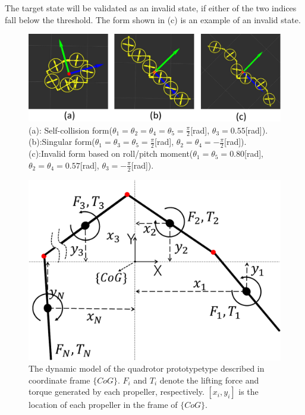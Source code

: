 \par
The target state will be validated as an invalid state, if either of the two indices fall below the threshold. The form shown in (c) is an example of an invalid state.

\begin{figure}[t]
  \begin{center}
    \includegraphics[width=1.0\columnwidth]{figs/invalid_forms.pdf}
  \end{center}
  \caption{(a): Self-collision form($\theta_1=\theta_2=\theta_4=\theta_5=\frac{\pi}{2}$[rad], $\theta_3=0.55$[rad]). (b):Singular form($\theta_1=\theta_3=\theta_5=\frac{\pi}{2}$[rad], $\theta_2=\theta_4=-\frac{\pi}{2}$[rad]). (c):Invalid form based on roll/pitch moment($\theta_1=\theta_5=0.80$[rad], $\theta_2=\theta_4=0.57$[rad], $\theta_3=-\frac{\pi}{2}$[rad]).\label{figure:invalid_forms}}
\end{figure}

\begin{figure}[t]
  \begin{center}
    \includegraphics[width=0.9\columnwidth]{figs/dynamic_model.pdf}
    \caption{The dynamic model of the quadrotor prototypetype described in coordinate frame $\{CoG\}$. $F_i$ and $T_i$ denote the lifting force and torque generated by each propeller, respectively. $[x_i, y_i]$ is the location of each propeller in the frame of $\{CoG\}$.\label{figure:dynamic_model}}
  \end{center}
\end{figure}


